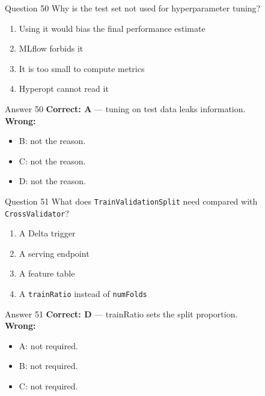 \documentclass[aspectratio=169,11pt]{beamer}
\begin{document}
\begin{frame}{Question 50}
Why is the test set not used for hyperparameter tuning?
\begin{enumerate}[label=\Alph*.]
\item Using it would bias the final performance estimate
\item MLflow forbids it
\item It is too small to compute metrics
\item Hyperopt cannot read it
\end{enumerate}
\end{frame}
\begin{frame}{Answer 50}
\textbf{Correct: A} --- tuning on test data leaks information.\\
\vspace{0.5em}
\textbf{Wrong:}
\begin{itemize}
\item B: not the reason.
\item C: not the reason.
\item D: not the reason.
\end{itemize}
\end{frame}

\begin{frame}{Question 51}
What does \texttt{TrainValidationSplit} need compared with \texttt{CrossValidator}?
\begin{enumerate}[label=\Alph*.]
\item A Delta trigger
\item A serving endpoint
\item A feature table
\item A \texttt{trainRatio} instead of \texttt{numFolds}
\end{enumerate}
\end{frame}
\begin{frame}{Answer 51}
\textbf{Correct: D} --- trainRatio sets the split proportion.\\
\vspace{0.5em}
\textbf{Wrong:}
\begin{itemize}
\item A: not required.
\item B: not required.
\item C: not required.
\end{itemize}
\end{frame}
\end{document}
